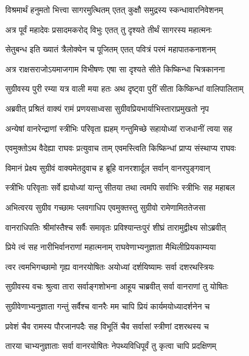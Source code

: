 \twolineshloka
{विश्रमार्थं हनुमतो भित्त्वा सागरमुत्थितम्}
{एतत् कुक्षौ समुद्रस्य स्कन्धावारनिवेशनम्} %

\twolineshloka
{अत्र पूर्वं महादेवः प्रसादमकरोद् विभुः}
{एतत् तु दृश्यते तीर्थं सागरस्य महात्मनः} %

\twolineshloka
{सेतुबन्ध इति ख्यातं त्रैलोक्येन च पूजितम्}
{एतत् पवित्रं परमं महापातकनाशनम्} %

\twolineshloka
{अत्र राक्षसराजोऽयमाजगाम विभीषणः}
{एषा सा दृश्यते सीते किष्किन्धा चित्रकानना} %

\twolineshloka
{सुग्रीवस्य पुरी रम्या यत्र वाली मया हतः}
{अथ दृष्ट्वा पुरीं सीता किष्किन्धां वालिपालिताम्} %

\twolineshloka
{अब्रवीत् प्रश्रितं वाक्यं रामं प्रणयसाध्वसा}
{सुग्रीवप्रियभार्याभिस्ताराप्रमुखतो नृप} %

\twolineshloka
{अन्येषां वानरेन्द्राणां स्त्रीभिः परिवृता ह्यहम्}
{गन्तुमिच्छे सहायोध्यां राजधानीं त्वया सह} %

\twolineshloka
{एवमुक्तोऽथ वैदेह्या राघवः प्रत्युवाच ताम्}
{एवमस्त्विति किष्किन्धां प्राप्य संस्थाप्य राघवः} %

\twolineshloka
{विमानं प्रेक्ष्य सुग्रीवं वाक्यमेतदुवाच ह}
{ब्रूहि वानरशार्दूल सर्वान् वानरपुङ्गवान्} %

\twolineshloka
{स्त्रीभिः परिवृताः सर्वे ह्ययोध्यां यान्तु सीतया}
{तथा त्वमपि सर्वाभिः स्त्रीभिः सह महाबल} %

\twolineshloka
{अभित्वरय सुग्रीव गच्छामः प्लवगाधिप}
{एवमुक्तस्तु सुग्रीवो रामेणामिततेजसा} %

\twolineshloka
{वानराधिपतिः श्रीमांस्तैश्च सर्वैः समावृतः}
{प्रविश्यान्तःपुरं शीघ्रं तारामुद्वीक्ष्य सोऽब्रवीत्} %

\twolineshloka
{प्रिये त्वं सह नारीभिर्वानराणां महात्मनाम्}
{राघवेणाभ्यनुज्ञाता मैथिलीप्रियकाम्यया} %

\twolineshloka
{त्वर त्वमभिगच्छामो गृह्य वानरयोषितः}
{अयोध्यां दर्शयिष्यामः सर्वा दशरथस्त्रियः} %

\twolineshloka
{सुग्रीवस्य वचः श्रुत्वा तारा सर्वाङ्गशोभना}
{आहूय चाब्रवीत् सर्वा वानराणां तु योषितः} %

\twolineshloka
{सुग्रीवेणाभ्यनुज्ञाता गन्तुं सर्वैश्च वानरैः}
{मम चापि प्रियं कार्यमयोध्यादर्शनेन च} %

\twolineshloka
{प्रवेशं चैव रामस्य पौरजानपदैः सह}
{विभूतिं चैव सर्वासां स्त्रीणां दशरथस्य च} %

\twolineshloka
{तारया चाभ्यनुज्ञाताः सर्वा वानरयोषितः}
{नेपथ्यविधिपूर्वं तु कृत्वा चापि प्रदक्षिणम्} %

